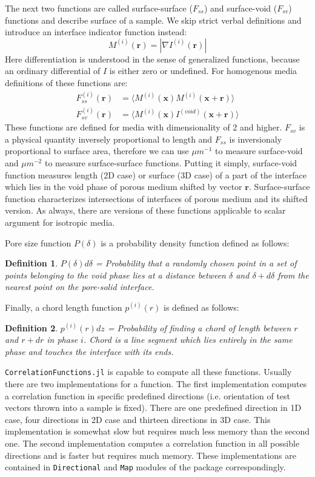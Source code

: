 \documentclass[reprint,amsmath,amssymb,aps,pre,showkeys,showpacs,nofootinbib]{revtex4-1}
\newtheorem{definition}{Definition}
\newcommand{\code}[1]{\colorbox{light-gray}{\texttt{#1}}}
\begin{document}
The next two functions are called surface-surface ($F_{ss}$) and surface-void
($F_{sv}$) functions and describe surface of a sample. We skip strict verbal
definitions and introduce an interface indicator function instead:
\begin{equation*}
  M^{(i)}(\bm{r}) = | \nabla I^{(i)}(\bm{r}) |
\end{equation*}
Here differentiation is understood in the sense of generalized functions,
because an ordinary differential of $I$ is either zero or undefined. For
homogenous media definitions of these functions are:
\begin{align}
  F_{ss}^{(i)}(\bm{r}) &= \langle M^{(i)}(\bm{x}) M^{(i)}(\bm{x} +
  \bm{r}) \rangle \label{eq:fss-def} \\
  F_{sv}^{(i)}(\bm{r}) &= \langle M^{(i)}(\bm{x}) I^{(void)}(\bm{x}
  + \bm{r}) \rangle \label{eq:fsv-def}
\end{align}
These functions are defined for media with dimensionality of 2 and
higher. $F_{sv}$ is a physical quantity inversely proportional to length and
$F_{ss}$ is inversionaly proportional to surface area, therefore we can use
$\mu m^{-1}$ to measure surface-void and $\mu m^{-2}$ to measure surface-surface
functions. Putting it simply, surface-void function measures length (2D case) or
surface (3D case) of a part of the interface which lies in the void phase of
porous medium shifted by vector $\bm{r}$. Surface-surface function characterizes
intersections of interfaces of porous medium and its shifted version. As always,
there are versions of these functions applicable to scalar argument for
isotropic media.

Pore size function $P(\delta)$ is a probability density function defined as
follows:
\begin{definition}
  $P(\delta)d\delta$ = Probability that a randomly chosen point in a set of points
  belonging to the void phase lies at a distance between $\delta$ and $\delta + d\delta$
  from the nearest point on the pore-solid interface.
\end{definition}

Finally, a chord length function $p^{(i)}(r)$ is defined as follows:
\begin{definition}
$p^{(i)}(r)dz$ = Probability of finding a chord of length between $r$ and $r+dr$
in phase $i$. Chord is a line segment which lies entirely in the same phase and
touches the interface with its ends.
\end{definition}

\verb+CorrelationFunctions.jl+ is capable to compute all these
functions. Usually there are two implementations for a function. The first
implementation computes a correlation function in specific predefined directions
(i.e. orientation of test vectors thrown into a sample is fixed). There are one
predefined direction in 1D case, four directions in 2D case and thirteen
directions in 3D case. This implementation is somewhat slow but requires much
less memory than the second one. The second implementation computes a
correlation function in all possible directions and is faster but requires much
memory. These implementations are contained in \code{Directional} and \code{Map}
modules of the package correspondingly.
\end{document}

